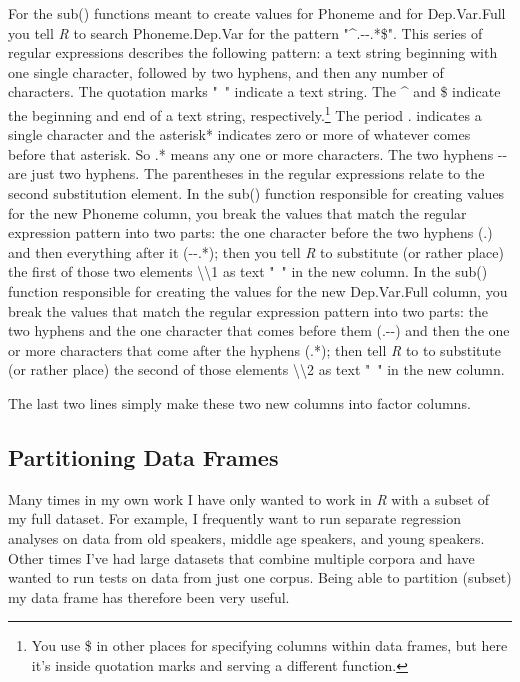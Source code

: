 \documentclass[
  12pt,
  letterpaper]{article}
\renewcommand\texttt[1]{{\ttfamily\color{BrickRed}#1}}
\begin{document}
For the \texttt{sub()} functions meant to create values for
\texttt{Phoneme} and for \texttt{Dep.Var.Full} you tell \emph{R} to
search \texttt{Phoneme.Dep.Var} for the pattern
\texttt{"\^{}.-\/-.*\$"}. This series of regular expressions describes
the following pattern: a text string beginning with one single
character, followed by two hyphens, and then any number of characters.
The quotation marks \texttt{"\ "} indicate a text string. The
\texttt{\^{}} and \texttt{\$} indicate the beginning and end of a text
string, respectively.\footnote{You use \texttt{\$} in other places for
  specifying columns within data frames, but here it's inside quotation
  marks and serving a different function.} The period \texttt{.}
indicates a single character and the asterisk\texttt{*} indicates zero
or more of whatever comes before that asterisk. So \texttt{.*} means any
one or more characters. The two hyphens \texttt{-\/-} are just two
hyphens. The parentheses in the regular expressions relate to the second
substitution element. In the \texttt{sub()} function responsible for
creating values for the new \texttt{Phoneme} column, you break the
values that match the regular expression pattern into two parts: the one
character before the two hyphens \texttt{(.)} and then everything after
it \texttt{(-\/-.*)}; then you tell \emph{R} to substitute (or rather
place) the first of those two elements
\texttt{\textbackslash{}\textbackslash{}1} as text \texttt{"\ "} in the
new column. In the \texttt{sub()} function responsible for creating the
values for the new \texttt{Dep.Var.Full} column, you break the values
that match the regular expression pattern into two parts: the two
hyphens and the one character that comes before them \texttt{(.-\/-)}
and then the one or more characters that come after the hyphens
\texttt{(.*)}; then tell \emph{R} to to substitute (or rather place) the
second of those elements \texttt{\textbackslash{}\textbackslash{}2} as
text \texttt{"\ "} in the new column.

The last two lines simply make these two new columns into factor
columns.

\hypertarget{partitioning-data-frames}{%
\subsection{Partitioning Data Frames}\label{partitioning-data-frames}}

Many times in my own work I have only wanted to work in \emph{R} with a
subset of my full dataset. For example, I frequently want to run
separate regression analyses on data from old speakers, middle age
speakers, and young speakers. Other times I've had large datasets that
combine multiple corpora and have wanted to run tests on data from just
one corpus. Being able to partition (subset) my data frame has therefore
been very useful.
\end{document}
